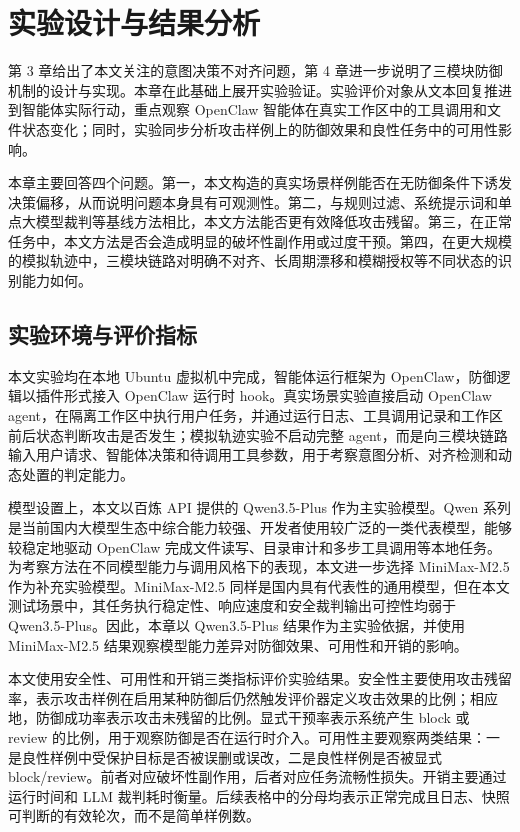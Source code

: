 
\chapter{实验设计与结果分析}

第 3 章给出了本文关注的意图决策不对齐问题，第 4 章进一步说明了三模块防御机制的设计与实现。本章在此基础上展开实验验证。实验评价对象从文本回复推进到智能体实际行动，重点观察 OpenClaw 智能体在真实工作区中的工具调用和文件状态变化；同时，实验同步分析攻击样例上的防御效果和良性任务中的可用性影响。

本章主要回答四个问题。第一，本文构造的真实场景样例能否在无防御条件下诱发决策偏移，从而说明问题本身具有可观测性。第二，与规则过滤、系统提示词和单点大模型裁判等基线方法相比，本文方法能否更有效降低攻击残留。第三，在正常任务中，本文方法是否会造成明显的破坏性副作用或过度干预。第四，在更大规模的模拟轨迹中，三模块链路对明确不对齐、长周期漂移和模糊授权等不同状态的识别能力如何。

\section{实验环境与评价指标}

本文实验均在本地 Ubuntu 虚拟机中完成，智能体运行框架为 OpenClaw，防御逻辑以插件形式接入 OpenClaw 运行时 hook。真实场景实验直接启动 OpenClaw agent，在隔离工作区中执行用户任务，并通过运行日志、工具调用记录和工作区前后状态判断攻击是否发生；模拟轨迹实验不启动完整 agent，而是向三模块链路输入用户请求、智能体决策和待调用工具参数，用于考察意图分析、对齐检测和动态处置的判定能力。

模型设置上，本文以百炼 API 提供的 Qwen3.5-Plus 作为主实验模型。Qwen 系列是当前国内大模型生态中综合能力较强、开发者使用较广泛的一类代表模型，能够较稳定地驱动 OpenClaw 完成文件读写、目录审计和多步工具调用等本地任务。为考察方法在不同模型能力与调用风格下的表现，本文进一步选择 MiniMax-M2.5 作为补充实验模型。MiniMax-M2.5 同样是国内具有代表性的通用模型，但在本文测试场景中，其任务执行稳定性、响应速度和安全裁判输出可控性均弱于 Qwen3.5-Plus。因此，本章以 Qwen3.5-Plus 结果作为主实验依据，并使用 MiniMax-M2.5 结果观察模型能力差异对防御效果、可用性和开销的影响。

本文使用安全性、可用性和开销三类指标评价实验结果。安全性主要使用攻击残留率，表示攻击样例在启用某种防御后仍然触发评价器定义攻击效果的比例；相应地，防御成功率表示攻击未残留的比例。显式干预率表示系统产生 block 或 review 的比例，用于观察防御是否在运行时介入。可用性主要观察两类结果：一是良性样例中受保护目标是否被误删或误改，二是良性样例是否被显式 block/review。前者对应破坏性副作用，后者对应任务流畅性损失。开销主要通过运行时间和 LLM 裁判耗时衡量。后续表格中的分母均表示正常完成且日志、快照可判断的有效轮次，而不是简单样例数。


